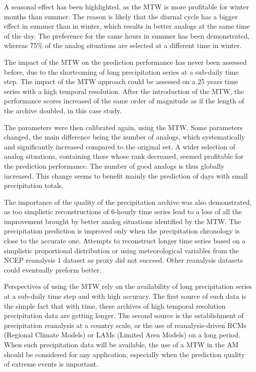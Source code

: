 \documentclass[hess, manuscript]{copernicus}
\begin{document}
A seasonal effect has been highlighted, as the MTW is more profitable for winter months than summer. The reason is likely that the diurnal cycle has a bigger effect in summer than in winter, which results in better analogs at the same time of the day. The preference for the same hours in summer has been demonstrated, whereas 75\% of the analog situations are selected at a different time in winter.

The impact of the MTW on the prediction performance has never been assessed before, due to the shortcoming of long precipitation series at a sub-daily time step. The impact of the MTW approach could be assessed on a 25 years time series with a high temporal resolution. After the introduction of the MTW, the performance scores increased of the same order of magnitude as if the length of the archive doubled, in this case study.

The parameters were then calibrated again, using the MTW. Some parameters changed, the main difference being the number of analogs, which systematically and significantly increased compared to the original set. A wider selection of analog situations, containing those whose rank decreased, seemed profitable for the prediction performance. The number of good analogs is thus globally increased. This change seems to benefit mainly the prediction of days with small precipitation totals.

The importance of the quality of the precipitation archive was also demonstrated, as too simplistic reconstructions of 6-hourly time series lead to a loss of all the improvement brought by better analog situations identified by the MTW. The precipitation prediction is improved only when the precipitation chronology is close to the accurate one. Attempts to reconstruct longer time series based on a simplistic proportional distribution or using meteorological variables from the NCEP reanalysis 1 dataset as proxy did not succeed. Other reanalysis datasets could eventually preform better.

Perspectives of using the MTW rely on the availability of long precipitation series at a sub-daily time step and with high accuracy. The first source of such data is the simple fact that with time, these archives of high temporal resolution precipitation data are getting longer. The second source is the establishment of precipitation reanalysis at a country scale, or the use of reanalysis-driven RCMs (Regional Climate Models) or LAMs (Limited Area Models) on a long period. When such precipitation data will be available, the use of a MTW in the AM should be considered for any application, especially when the prediction quality of extreme events is important.
\end{document}
